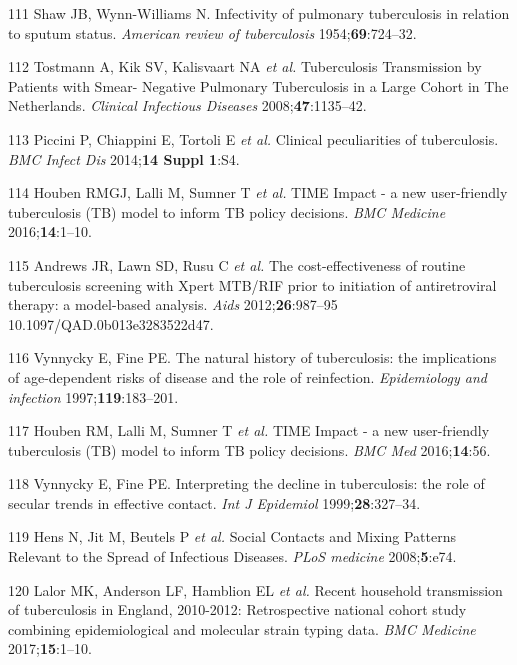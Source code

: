 \documentclass[11pt,twoside]{bristolthesis}
\begin{document}
  \leavevmode\hypertarget{ref-PMID:13148535}{}%
  111 Shaw JB, Wynn-Williams N. Infectivity of pulmonary tuberculosis in relation to sputum status. \emph{American review of tuberculosis} 1954;\textbf{69}:724--32.
  
  \leavevmode\hypertarget{ref-Tostmann2008}{}%
  112 Tostmann A, Kik SV, Kalisvaart NA \emph{et al.} Tuberculosis Transmission by Patients with Smear- Negative Pulmonary Tuberculosis in a Large Cohort in The Netherlands. \emph{Clinical Infectious Diseases} 2008;\textbf{47}:1135--42.
  
  \leavevmode\hypertarget{ref-Piccini2014}{}%
  113 Piccini P, Chiappini E, Tortoli E \emph{et al.} Clinical peculiarities of tuberculosis. \emph{BMC Infect Dis} 2014;\textbf{14 Suppl 1}:S4.
  
  \leavevmode\hypertarget{ref-Houben2016}{}%
  114 Houben RMGJ, Lalli M, Sumner T \emph{et al.} TIME Impact - a new user-friendly tuberculosis (TB) model to inform TB policy decisions. \emph{BMC Medicine} 2016;\textbf{14}:1--10.
  
  \leavevmode\hypertarget{ref-Andrews2012}{}%
  115 Andrews JR, Lawn SD, Rusu C \emph{et al.} The cost-effectiveness of routine tuberculosis screening with Xpert MTB/RIF prior to initiation of antiretroviral therapy: a model-based analysis. \emph{Aids} 2012;\textbf{26}:987--95 10.1097/QAD.0b013e3283522d47.
  
  \leavevmode\hypertarget{ref-Vynnycky1997}{}%
  116 Vynnycky E, Fine PE. The natural history of tuberculosis: the implications of age-dependent risks of disease and the role of reinfection. \emph{Epidemiology and infection} 1997;\textbf{119}:183--201.
  
  \leavevmode\hypertarget{ref-Houben2016a}{}%
  117 Houben RM, Lalli M, Sumner T \emph{et al.} TIME Impact - a new user-friendly tuberculosis (TB) model to inform TB policy decisions. \emph{BMC Med} 2016;\textbf{14}:56.
  
  \leavevmode\hypertarget{ref-Vynnycky1999}{}%
  118 Vynnycky E, Fine PE. Interpreting the decline in tuberculosis: the role of secular trends in effective contact. \emph{Int J Epidemiol} 1999;\textbf{28}:327--34.
  
  \leavevmode\hypertarget{ref-Mossong2008}{}%
  119 Hens N, Jit M, Beutels P \emph{et al.} Social Contacts and Mixing Patterns Relevant to the Spread of Infectious Diseases. \emph{PLoS medicine} 2008;\textbf{5}:e74.
  
  \leavevmode\hypertarget{ref-Lalor2017}{}%
  120 Lalor MK, Anderson LF, Hamblion EL \emph{et al.} Recent household transmission of tuberculosis in England, 2010-2012: Retrospective national cohort study combining epidemiological and molecular strain typing data. \emph{BMC Medicine} 2017;\textbf{15}:1--10.
  
\end{document}
